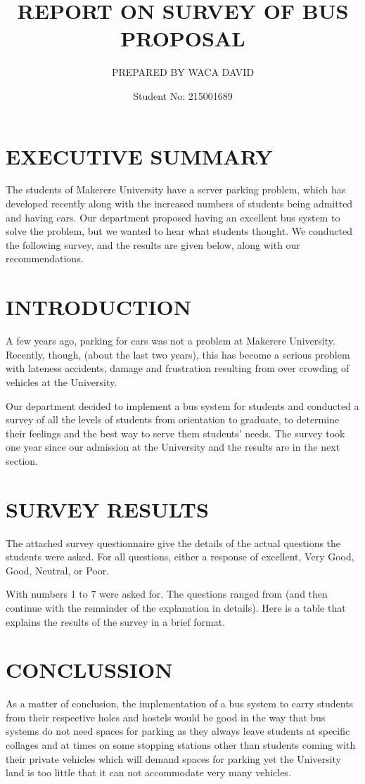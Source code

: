 \documentclass{article}
\begin{document}
		\title{REPORT ON SURVEY OF BUS PROPOSAL}
		\author{PREPARED BY WACA DAVID}
		\date{Student No: 215001689}
		\maketitle
	
	\tableofcontents

\section{EXECUTIVE SUMMARY}
The students of Makerere University have a server parking problem, which has developed recently along with the increased numbers of students being admitted and having cars. Our department proposed having an excellent bus system to solve the problem, but we wanted to hear what students thought. We conducted the following survey, and the results are given below, along with our recommendations.

\section{INTRODUCTION}
A few years ago, parking for cars was not a problem at Makerere University. Recently, though, (about the last two years), this has become a serious problem with lateness accidents, damage and frustration resulting from over crowding of vehicles at the University.

Our department decided to implement a bus system for students and conducted a survey of all the levels of students from orientation to graduate, to determine their feelings and the best way to serve them students’ needs. The survey took one year since our admission at the University and the results are in the next section.

\section{SURVEY RESULTS}
The attached survey questionnaire give the details of the actual questions the students were asked. For all questions, either a response of excellent, Very Good, Good, Neutral, or Poor.

With numbers 1 to 7 were asked for. The questions ranged from (and then continue with the remainder of the explanation in details).
Here is a table that explains the results of the survey in a brief format.

\section{CONCLUSSION}
As a matter of conclusion, the implementation of a bus system to carry students from their respective holes and hostels would be good in the way that bus systems do not need spaces for parking as they always leave students at specific collages and at times on some stopping stations other than students coming with their private vehicles which will demand spaces for parking yet the University land is too little that it can not accommodate very many vehicles.
\end{document}
